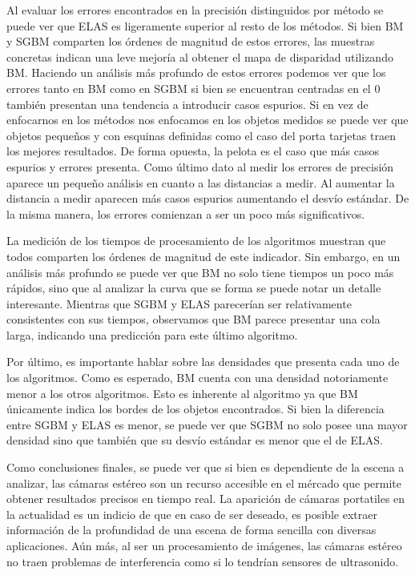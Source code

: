 \documentclass[11pt,a4paper,titlepage]{article}
\begin{document}
Al evaluar los errores encontrados en la precisión distinguidos por método se puede ver que ELAS es ligeramente superior al resto de los métodos. Si bien BM y SGBM comparten los órdenes de magnitud de estos errores, las muestras concretas indican una leve mejoría al obtener el mapa de disparidad utilizando BM.
Haciendo un análisis más profundo de estos errores podemos ver que los errores tanto en BM como en SGBM si bien se encuentran centradas en el 0 también presentan una tendencia a introducir casos espurios.
Si en vez de enfocarnos en los métodos nos enfocamos en los objetos medidos se puede ver que objetos pequeños y con esquinas definidas como el caso del porta tarjetas traen los mejores resultados. De forma opuesta, la pelota es el caso que más casos espurios y errores presenta.
Como último dato al medir los errores de precisión aparece un pequeño análisis en cuanto a las distancias a medir. Al aumentar la distancia a medir aparecen más casos espurios aumentando el desvío estándar. De la misma manera, los errores comienzan a ser un poco más significativos.

La medición de los tiempos de procesamiento de los algoritmos muestran que todos comparten los órdenes de magnitud de este indicador. Sin embargo, en un análisis más profundo se puede ver que BM no solo tiene tiempos un poco más rápidos, sino que al analizar la curva que se forma se puede notar un detalle interesante. Mientras que SGBM y ELAS parecerían ser relativamente consistentes con sus tiempos, observamos que BM parece presentar una cola larga, indicando una predicción para este último algoritmo.

Por último, es importante hablar sobre las densidades que presenta cada uno de los algoritmos. Como es esperado, BM cuenta con una densidad notoriamente menor a los otros algoritmos. Esto es inherente al algoritmo ya que BM únicamente indica los bordes de los objetos encontrados. Si bien la diferencia entre SGBM y ELAS es menor, se puede ver que SGBM no solo posee una mayor densidad sino que también que su desvío estándar es menor que el de ELAS.

Como conclusiones finales, se puede ver que si bien es dependiente de la escena a analizar, las cámaras estéreo son un recurso accesible en el mércado que permite obtener resultados precisos en tiempo real. La aparición de cámaras portatiles en la actualidad es un indicio de que en caso de ser deseado, es posible extraer información de la profundidad de una escena de forma sencilla con diversas aplicaciones.
Aún más, al ser un procesamiento de imágenes, las cámaras estéreo no traen problemas de interferencia como si lo tendrían sensores de ultrasonido.
\end{document}
